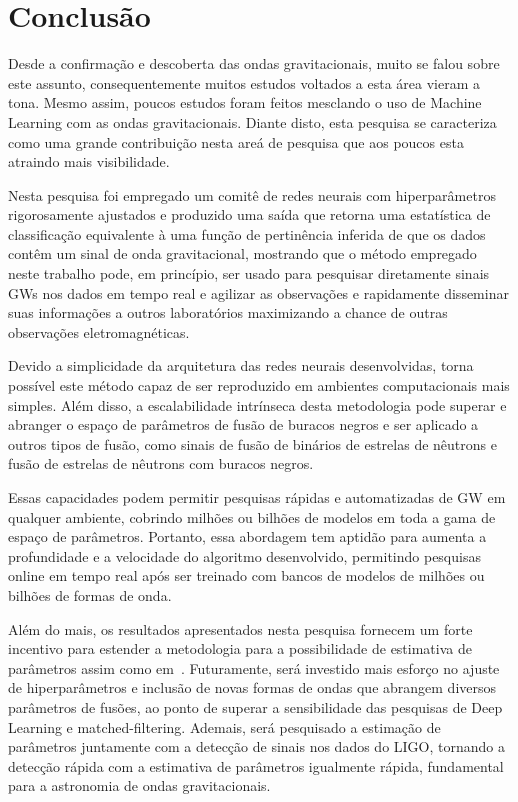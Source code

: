 \chapter{Conclusão}
\label{chap:conclusao}

Desde a confirmação e descoberta das ondas gravitacionais, muito se falou sobre este assunto, consequentemente muitos estudos voltados a esta área vieram a tona. Mesmo assim, poucos estudos foram feitos mesclando o uso de Machine Learning com as ondas gravitacionais. Diante disto, esta pesquisa se caracteriza como uma grande contribuição nesta areá de pesquisa que aos poucos esta atraindo mais visibilidade. 

Nesta pesquisa foi empregado um comitê de redes neurais com hiperparâmetros rigorosamente ajustados e produzido uma saída que retorna uma estatística de classificação equivalente à uma função de pertinência inferida de que os dados contêm um sinal de onda gravitacional, mostrando que o método empregado neste trabalho pode, em princípio, ser usado para pesquisar diretamente sinais GWs nos dados em tempo real e agilizar as observações e rapidamente disseminar suas informações a outros laboratórios  maximizando a chance de outras observações eletromagnéticas.

Devido a simplicidade da arquitetura das redes neurais desenvolvidas, torna possível este método capaz de ser reproduzido em ambientes computacionais mais simples. Além disso, a escalabilidade intrínseca desta metodologia pode superar e abranger o espaço de parâmetros de fusão de buracos negros e ser aplicado a outros tipos de fusão, como sinais de fusão de binários de estrelas de nêutrons e fusão de estrelas de nêutrons com buracos negros. 

Essas capacidades podem permitir pesquisas rápidas e automatizadas de GW em qualquer ambiente, cobrindo milhões ou bilhões de modelos em toda a gama de espaço de parâmetros. Portanto, essa abordagem tem aptidão para aumenta a profundidade e a velocidade do algoritmo desenvolvido, permitindo pesquisas online em tempo real após ser treinado com bancos de modelos de milhões ou bilhões de formas de onda.

Além do mais, os resultados apresentados nesta pesquisa fornecem um forte incentivo para estender a metodologia para a possibilidade de estimativa de parâmetros assim como em~\cite{PhysRevD.97.044039,GEORGE201864}. Futuramente, será investido mais esforço no ajuste de hiperparâmetros e inclusão de novas formas de ondas que abrangem diversos parâmetros de fusões, ao ponto de superar a sensibilidade das pesquisas de Deep Learning e matched-filtering. Ademais, será pesquisado a estimação de parâmetros juntamente com a detecção de sinais nos dados do LIGO, tornando a detecção rápida com a estimativa de parâmetros igualmente rápida, fundamental para a astronomia de ondas gravitacionais.

